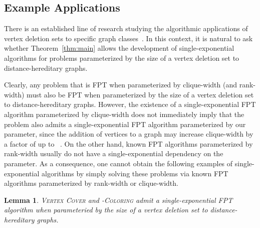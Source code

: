 \documentclass[11pt]{elsarticle}
\newtheorem{lemma}[theorem]{Lemma}
\begin{document}
\subsection{Example Applications}
There is an established line of research studying the algorithmic applications of vertex deletion sets to specific graph classes~\cite{GajarskyHOORRVS13,EibenGanianSzeider15,EibenGanianSzeider15b,FellowsLMRS08}.
In this context, it is natural to ask whether Theorem~\ref{thm:main} allows the development of single-exponential algorithms for problems parameterized by the size of a vertex deletion set to distance-hereditary graphs. 

Clearly, any problem that is FPT when parameterized by clique-width (and rank-width) must also be FPT when parameterized by the size of a vertex deletion set to distance-hereditary graphs. However, the existence of a single-exponential FPT algorithm parameterized by clique-width does not immediately imply that the problem also admits a single-exponential FPT algorithm parameterized by our parameter, since the addition of  vertices to a graph may increase clique-width by a factor of up to ~\cite{Gurski2016}. On the other hand, known FPT algorithms parameterized by rank-width usually do not have a single-exponential dependency on the parameter. As a consequence, one cannot obtain the following examples of single-exponential algorithms by simply solving these problems via known FPT algorithms parameterized by rank-width or clique-width.

\begin{lemma}
 \textsc{Vertex Cover} and \textsc{-Coloring} admit a single-exponential FPT algorithm when parameteried by the size of a vertex deletion set to distance-hereditary graphs.
\end{lemma}
\end{document}

